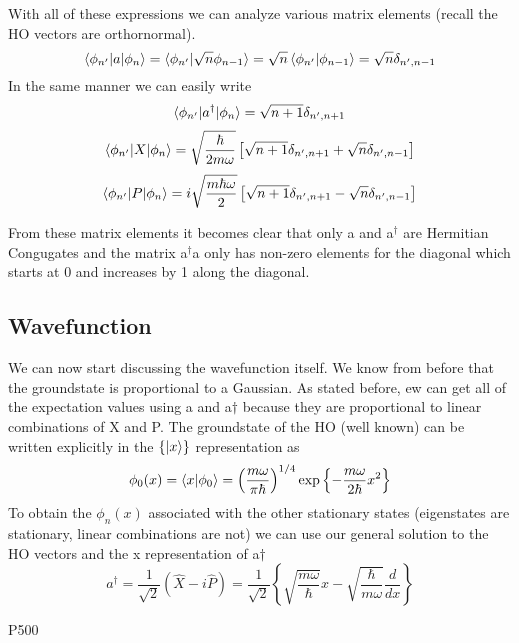 \documentclass{article}
\newcommand{\be}{\begin{equation}}
\newcommand{\ee}{\end{equation}}
\newcommand{\dg}{\dagger}
\begin{document}
With all of these expressions we can analyze various matrix elements (recall the HO vectors are orthornormal).
\be
\braket{\phi_{n'}|a|\phi_n} =  \braket{\phi_{n'}|\sqrt{n}\phi_{n-1}} = \sqrt{n}\braket{\phi_{n'}|\phi_{n-1}} = \sqrt{n} \delta_{n',n-1}
\ee
In the same manner we can easily write 
\be
\braket{\phi_{n'}|a^\dg|\phi_n} =\sqrt{n+1} \delta_{n',n+1}
\ee
\be
\braket{\phi_{n'}|X|\phi_n} = \sqrt{\frac{\hbar}{2m\omega}}\left[\sqrt{n+1}\delta_{n',n+1} + \sqrt{n} \delta_{n',n-1}\right]
\ee
\be
\braket{\phi_{n'}|P|\phi_n} = i\sqrt{\frac{m\hbar\omega}{2}}\left[\sqrt{n+1}\delta_{n',n+1} - \sqrt{n} \delta_{n',n-1}\right]
\ee

From these matrix elements it becomes clear that only a and a$^\dg$ are Hermitian Congugates and the matrix a$^\dg$a only has non-zero elements for the diagonal which starts at 0 and increases by 1 along the diagonal. 

\subsection*{Wavefunction}
We can now start discussing the wavefunction itself.
We know from before that the groundstate  is proportional to a Gaussian.
As stated before, ew can get all of the expectation values using a and a$\dg$ because they are proportional to linear combinations of X and P.
The groundstate of the HO (well known) can be written explicitly in the $\{\ket{x}\}$ representation as
\be
\phi_0(x) = \braket{x|\phi_0} = \left(\frac{m\omega}{\pi\hbar}\right)^{1/4} \text{exp} \left\{-\frac{m\omega}{2\hbar}x^2\right\}
\ee
To obtain the $\phi_n(x)$ associated with the other stationary states (eigenstates are stationary, linear combinations are not) we can use our general solution to the HO vectors and the x representation of a$\dg$
\be
a^\dg = \frac{1}{\sqrt{2}} \left(\hat{X} - i\hat{P}\right) = \frac{1}{\sqrt{2}} \left\{ \sqrt{\frac{m\omega}{\hbar}} x - \sqrt{\frac{\hbar}{m\omega}}\frac{d}{dx}\right\}
\ee

P500
\end{document}
